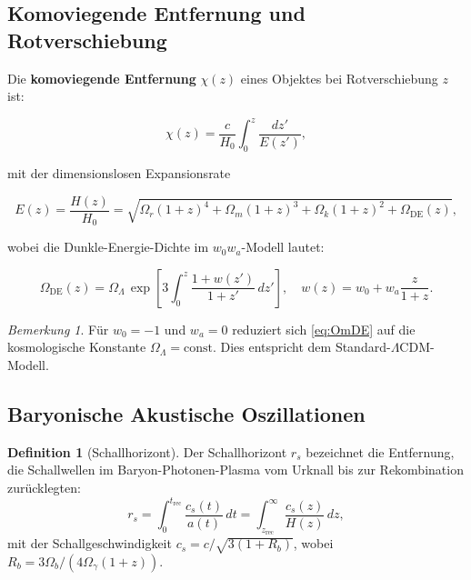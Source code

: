 ﻿\documentclass[a4paper,12pt]{article}
\theoremstyle{definition}
\newtheorem{definition}{Definition}[section]
\theoremstyle{remark}
\newtheorem{bemerkung}{Bemerkung}[section]
\begin{document}
\subsection{Komoviegende Entfernung und Rotverschiebung}

Die \textbf{komoviegende Entfernung} $\chi(z)$ eines Objektes bei
Rotverschiebung $z$ ist:

\begin{equation}
  \label{eq:chi}
  \chi(z) = \frac{c}{H_0}\int_0^z \frac{dz'}{E(z')},
\end{equation}

mit der dimensionslosen Expansionsrate

\begin{equation}
  \label{eq:Ez}
  E(z) = \frac{H(z)}{H_0}
       = \sqrt{\Omega_r(1+z)^4 + \Omega_m(1+z)^3 + \Omega_k(1+z)^2 + \Omega_\mathrm{DE}(z)},
\end{equation}

wobei die Dunkle-Energie-Dichte im $w_0 w_a$-Modell lautet:

\begin{equation}
  \label{eq:OmDE}
  \Omega_\mathrm{DE}(z) = \Omega_\Lambda\,\exp\!\left[3\int_0^z
    \frac{1 + w(z')}{1+z'}\,dz'\right],\quad
  w(z) = w_0 + w_a\frac{z}{1+z}.
\end{equation}

\begin{bemerkung}
  Für $w_0 = -1$ und $w_a = 0$ reduziert sich \eqref{eq:OmDE} auf die
  kosmologische Konstante $\Omega_\Lambda = \text{const}$. Dies entspricht dem
  Standard-$\Lambda$CDM-Modell.
\end{bemerkung}

\subsection{Baryonische Akustische Oszillationen}

\begin{definition}[Schallhorizont]
  Der Schallhorizont $r_s$ bezeichnet die Entfernung, die Schallwellen im
  Baryon-Photonen-Plasma vom Urknall bis zur Rekombination zurücklegten:
  \begin{equation}
    \label{eq:rs}
    r_s = \int_0^{t_\mathrm{rec}} \frac{c_s(t)}{a(t)}\,dt
        = \int_{z_\mathrm{rec}}^\infty \frac{c_s(z)}{H(z)}\,dz,
  \end{equation}
  mit der Schallgeschwindigkeit $c_s = c/\sqrt{3(1+R_b)}$, wobei
  $R_b = 3\Omega_b/(4\Omega_\gamma(1+z))$.
\end{definition}
\end{document}
